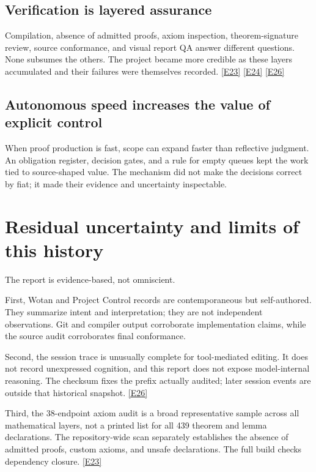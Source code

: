 \documentclass[11pt,a4paper]{article}
\newcommand{\ev}[1]{%
  \hyperref[ev:#1]{\textcolor{ReportBlue}{\textsf{\scriptsize[#1]}}}}
\begin{document}
\subsection{Verification is layered assurance}

Compilation, absence of admitted proofs, axiom inspection, theorem-signature review,
source conformance, and visual report QA answer different questions. None subsumes
the others. The project became more credible as these layers accumulated and their
failures were themselves recorded. \ev{E23}\ev{E24}\ev{E26}

\subsection{Autonomous speed increases the value of explicit control}

When proof production is fast, scope can expand faster than reflective judgment. An
obligation register, decision gates, and a rule for empty queues kept the work tied
to source-shaped value. The mechanism did not make the decisions correct by fiat; it
made their evidence and uncertainty inspectable.

\section{Residual uncertainty and limits of this history}
\label{sec:limits}

The report is evidence-based, not omniscient.

First, Wotan and Project Control records are contemporaneous but self-authored. They
summarize intent and interpretation; they are not independent observations. Git and
compiler output corroborate implementation claims, while the source audit
corroborates final conformance.

Second, the session trace is unusually complete for tool-mediated editing. It does
not record unexpressed cognition, and this report does not expose model-internal
reasoning. The checksum fixes the prefix actually audited; later session events are
outside that historical snapshot. \ev{E26}

Third, the 38-endpoint axiom audit is a broad representative sample across all
mathematical layers, not a printed list for all 439 theorem and lemma declarations.
The repository-wide scan separately establishes the absence of admitted proofs,
custom axioms, and unsafe declarations. The full build checks dependency closure.
\ev{E23}
\end{document}
